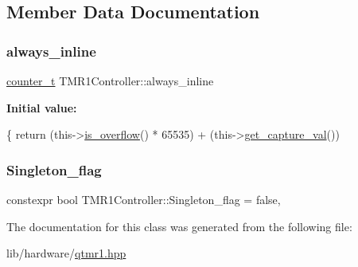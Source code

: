 \subsection{Member Data Documentation}
\mbox{\label{classTMR1Controller_adce8e8a496510485a88ccc5b88595672}} 
\subsubsection{\texorpdfstring{always\+\_\+inline}{always\_inline}}
{\footnotesize\ttfamily \hyperlink{types_8hpp_ac89ac912f524b3e3fa3720ea55fec966}{counter\+\_\+t} T\+M\+R1\+Controller\+::always\+\_\+inline}

{\bfseries Initial value\+:}
\begin{DoxyCode}
\{
        \textcolor{keywordflow}{return} (this->\hyperlink{classTMR1Controller_a06052b4a881156be3c7a4b6495d8ca11}{is\_overflow}() * 65535) + (this->\hyperlink{classTMR1Controller_a3d07eed72365e7a7b44fadefb23b9ba6}{get\_capture\_val}())
\end{DoxyCode}
\mbox{\label{classTMR1Controller_a532b729ca9a7c28e5f4d221f80487241}} 
\subsubsection{\texorpdfstring{Singleton\+\_\+flag}{Singleton\_flag}}
{\footnotesize\ttfamily constexpr bool T\+M\+R1\+Controller\+::\+Singleton\+\_\+flag = false\hspace{0.3cm}{\ttfamily [static]}, {\ttfamily [private]}}



The documentation for this class was generated from the following file\+:\begin{DoxyCompactItemize}
\item 
lib/hardware/\hyperlink{qtmr1_8hpp}{qtmr1.\+hpp}\end{DoxyCompactItemize}
